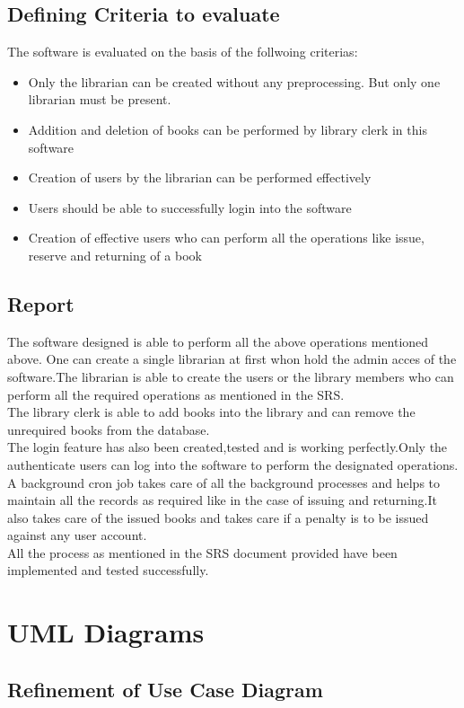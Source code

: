\documentclass[a4paper]{article}
\begin{document}
\subsection{Defining Criteria to evaluate}
The software is evaluated on the basis of the follwoing criterias:
\begin{itemize}
\item Only the librarian can be created without any preprocessing. But only one librarian must be present.
\item Addition and deletion of books can be performed by library clerk in this software
\item Creation of users by the librarian can be performed effectively
\item Users should be able to successfully login into the software
\item Creation of effective users who can perform all the operations like issue, reserve and returning of a book
\end{itemize}
\subsection{Report}
The software designed is able to perform all the above operations mentioned above. One can create a single librarian at first whon hold the admin acces of the software.The librarian is able to create the users or the library members who can perform all the required operations as mentioned in the SRS.
\\The library clerk is able to add books into the library and can remove the unrequired books from the database.
\\The login feature has also been created,tested and is working perfectly.Only the authenticate users can log into the software to perform the designated operations.
\\A background cron job takes care of all the background processes and helps to maintain all the records as required like in the case of issuing and returning.It also takes care of the issued books and takes care if a penalty is to be issued against any user account.
\\All the process as mentioned in the SRS document provided have been implemented and tested successfully.

\section{UML Diagrams}

\subsection{Refinement of Use Case Diagram}
\end{document}
